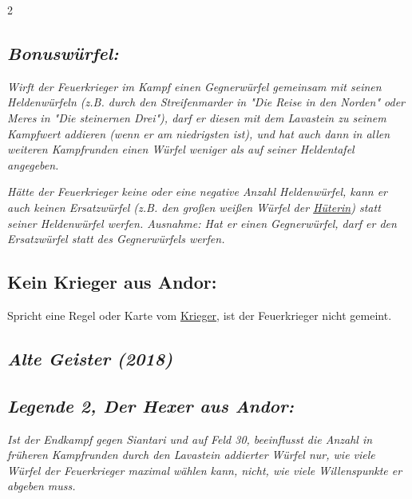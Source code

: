 \documentclass[10pt, a4paper, oneside]{book}
\newcommand{\fan}[1]{\textit{#1}}
\begin{document}
\begin{multicols*}{2}
\begin{nobgcolor}
\subsection{\fan{Bonuswürfel:}}

\fan{Wirft der Feuerkrieger im Kampf einen Gegnerwürfel gemeinsam mit seinen Heldenwürfeln (z.B. durch den Streifenmarder in "Die Reise in den Norden" oder Meres in "Die steinernen Drei"), darf er diesen mit dem Lavastein zu seinem Kampfwert addieren (wenn er am niedrigsten ist), und hat auch dann in allen weiteren Kampfrunden einen Würfel weniger als auf seiner Heldentafel angegeben.}

\fan{Hätte der Feuerkrieger keine oder eine negative Anzahl Heldenwürfel, kann er auch keinen Ersatzwürfel (z.B. den großen weißen Würfel der \hyperref[hueterin]{Hüterin}) statt seiner Heldenwürfel werfen. Ausnahme: Hat er einen Gegnerwürfel, darf er den Ersatzwürfel statt des Gegnerwürfels werfen.}









\subsection{Kein Krieger aus Andor:}

Spricht eine Regel oder Karte vom \hyperref[krieger]{Krieger}, ist der Feuerkrieger nicht gemeint.

\end{nobgcolor}




\columnbreak

\begin{bgcolor}[color-ag]
\section{\fan{Alte Geister (2018)}}

\subsection{\fan{Legende 2, Der Hexer aus Andor:}}

\fan{Ist der Endkampf gegen Siantari und auf Feld 30, beeinflusst die Anzahl in früheren Kampfrunden durch den Lavastein addierter Würfel nur, wie viele Würfel der Feuerkrieger maximal wählen kann, nicht, wie viele Willenspunkte er abgeben muss.}


\end{bgcolor}






\end{multicols*}
\end{document}
